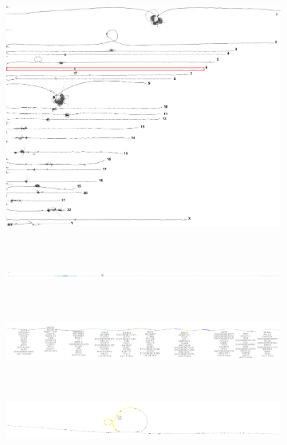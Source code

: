 \begin{figure}[!htb]
	\centering
	\begin{subfigure}{1.0\textwidth}
		\centering
		\caption{}
		\includegraphics[width=1.0\linewidth]{fig/2D/hprc-v1.0-pggb.og.lay.H4000.r4.0-highlighted.png}
		\label{fig:sfig1}
	\end{subfigure}
	\\
	\begin{subfigure}{1.0\textwidth}
		\centering
		\caption{}
		\includegraphics[width=1.0\linewidth]{fig/2D/grch38.chr6.MHC_annotated.png}
		\label{fig:sfig2}
	\end{subfigure}
	\\
\begin{subfigure}{1.0\textwidth}
	\centering
	\caption{}
	\includegraphics[width=1.0\linewidth]{fig/2D/grch38.chr6.MHC_genes_annotated.png}
	\label{fig:sfig3}
\end{subfigure}
	\\
\begin{subfigure}{1.0\textwidth}
	\centering
	\caption{}
	\includegraphics[width=1.0\linewidth]{fig/2D/grch38.chr6.C4_gene_annotated.png}

\end{subfigure}
\end{figure}
